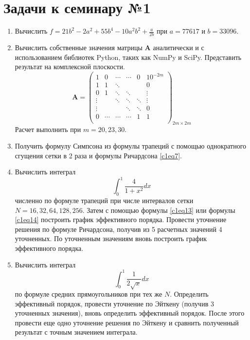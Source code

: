 \documentclass{article}
\begin{document}
\newpage

\section*{Задачи к семинару №1}
\begin{enumerate}
\item Вычислить $\displaystyle f = 21b^2 - 2a^2 + 55b^4 - 10a^2b^2 + \frac{a}{2b}$ при $a = 77617$ и $b = 33096$.
\item Вычислить собственные значения матрицы $\mathbf{A}$ аналитически и с использованием библиотек Python, таких как NumPy и SciPy. Представить результат на комплексной плоскости.
\begin{equation} \nonumber
	\mathbf{A} = 
	\begin{pmatrix}
		1 & 0 & \cdots & \cdots & 0 & 10^{-2m} \\
		1 & 1 & \ddots &  &  & 0 \\
		0 & 1 & \ddots &  \ddots &  & \vdots \\
		\vdots &  & \ddots & \ddots & \ddots & \vdots \\
		\vdots &  &  & \ddots & \ddots & 0 \\
		0 & \cdots & \cdots &  \cdots & 1 & 1 \\
	\end{pmatrix}_{2m \times 2m}
\end{equation}
Расчет выполнить при $m = 20,23,30$.
\item Получить формулу Симпсона из формулы трапеций с помощью однократного сгущения сетки в 2 раза и формулы Ричардсона \eqref{c1eq7}.
\item Вычислить интеграл 
\begin{equation} \nonumber
	\int_{0}^{1} \frac{4}{1 + x^2} dx
\end{equation}
численно по формуле трапеций при числе интервалов сетки $N = 16,32,64,128,256$. Затем с помощью формулы \eqref{c1eq13} или формулы \eqref{c1eq14} построить график эффективного порядка. Провести уточнение решения по формуле Ричардсона, получив из 5 расчетных значений 4 уточненных. По уточненным значениям вновь построить график эффективного порядка.
\item Вычислить интеграл 
\begin{equation} \nonumber
	\int_{0}^{1} \frac{1}{2 \sqrt{x}} dx
\end{equation}
по формуле средних прямоугольников при тех же $N$. Определить эффективный порядок, провести уточнение по Эйткену (получив 3 уточненных значения), вновь определить эффективный порядок. После этого провести еще одно уточнение решения по Эйткену и сравнить полученный результат с точным значением интеграла.
\end {enumerate}
\end{document}
